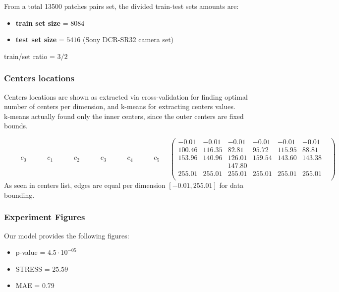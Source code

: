 		From a total 13500 patches pairs set, the divided train-test sets amounts are:
		\begin{itemize}
			\item \textbf{train set size} = $8084$ 
			\item \textbf{test set size} = $5416$ (Sony DCR-SR32 camera set)
		\end{itemize}
		
		train/set ratio = $3/2$

	\subsubsection{Centers locations}
	
	Centers locations are shown as extracted via cross-validation for finding optimal number of centers per dimension, and k-means for extracting centers values. \\
	k-means actually found only the inner centers, since the outer centers are fixed bounds.


	$
	\begin{matrix}  \qquad  c_0 \quad  \qquad c_1 \quad  \qquad c_2 \qquad \quad  c_3 \qquad \quad c_4 \qquad \quad c_5 \quad \end{matrix}
			
	
	\begin{pmatrix}
			     -0.01 &     -0.01 &    -0.01 & -0.01   & -0.01   & -0.01    \\
				100.46 &   116.35 &    82.81 &    95.72 & 115.95 & 88.81     \\
				153.96 &   140.96 &   126.01 &   159.54 & 143.60 & 143.38    \\
				       &          &   147.80 &          &        &             \\
	     		 255.01 &  255.01 &   255.01 &   255.01 &  255.01 &  255.01 & \\
			\end{pmatrix}
	$ 
\\
	

	As seen in centers list, edges are equal per dimension $[-0.01 , 255.01]$ for data bounding.\\
	
	\subsubsection{Experiment Figures}	
	Our model provides the following figures:	
	\begin{itemize}
	\item 	p-value = $4.5 \cdot 10 ^{-05}$
	\item 	STRESS = $25.59$
	\item 	MAE = $0.79$
	
	\end{itemize}

